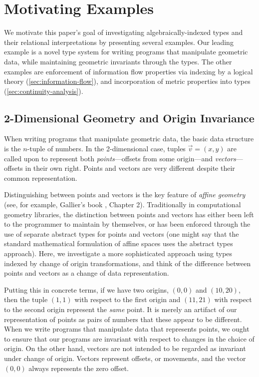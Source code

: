 \section{Motivating Examples}
\label{sec:motivating-examples}

We motivate this paper's goal of investigating algebraically-indexed
types and their relational interpretations by presenting several
examples. Our leading example is a novel type system for writing
programs that manipulate geometric data, while maintaining geometric
invariants through the types. The other examples are enforcement of
information flow properties via indexing by a logical theory
(\autoref{sec:information-flow}), and incorporation of metric
properties into types (\autoref{sec:continuity-analysis}).

\subsection{2-Dimensional Geometry and Origin Invariance}

When writing programs that manipulate geometric data, the basic data
structure is the $n$-tuple of numbers. In the 2-dimensional case,
tuples $\vec{v} = (x,y)$ are called upon to represent both
\emph{points}---offsets from some origin---and
\emph{vectors}---offsets in their own right. Points and vectors are
very different despite their common representation.

Distinguishing between points and vectors is the key feature of
\emph{affine geometry} (see, for example, Gallier's book
\cite{gallier11geometric}, Chapter 2). Traditionally in computational
geometry libraries, the distinction between points and vectors has
either been left to the programmer to maintain by themselves, or has
been enforced through the use of separate abstract types for points
and vectors (one might say that the standard mathematical formulation
of affine spaces uses the abstract types approach). Here, we
investigate a more sophisticated approach using types indexed by
change of origin transformations, and think of the difference between
points and vectors as a change of data representation.

Putting this in concrete terms, if we have two origins, $(0,0)$ and
$(10,20)$, then the tuple $(1,1)$ with respect to the first origin and
$(11,21)$ with respect to the second origin represent the \emph{same}
point. It is merely an artifact of our representation of points as
pairs of numbers that these appear to be different. When we write
programs that manipulate data that represents points, we ought to
ensure that our programs are invariant with respect to changes in the
choice of origin. On the other hand, vectors are not intended to be
regarded as invariant under change of origin. Vectors represent
offsets, or movements, and the vector $(0,0)$ always represents the
zero offset.

